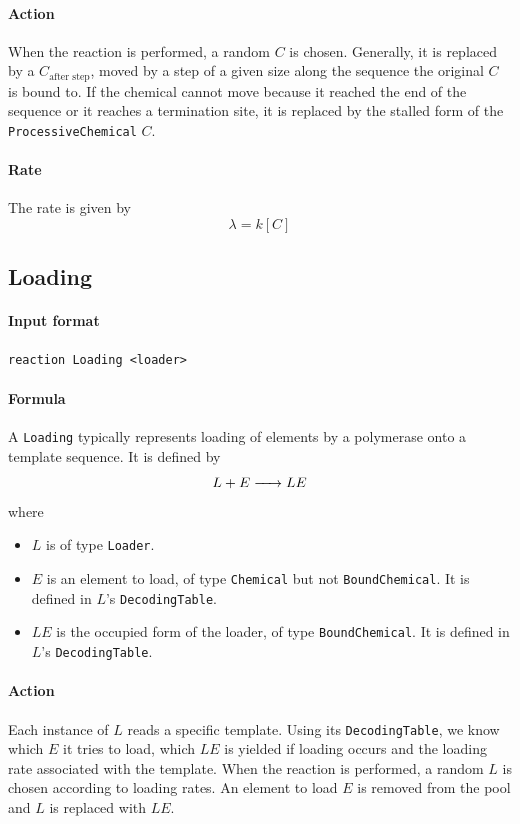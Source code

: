 \documentclass[12pt]{article}
\theoremstyle{definition}
\theoremstyle{remark}
\numberwithin{equation}{section}
\newcommand{\reactionIrr}[4]{#1 \ce{->[#3][#4]} #2}
\begin{document}
\paragraph{Action} When the reaction is performed, a random $C$ is chosen. Generally, it is replaced by a $C_\text{after step}$, moved by a step of a given size along the sequence the original $C$ is bound to. If the chemical cannot move because it reached the end of the sequence or it reaches a termination site, it is replaced by the stalled form of the \texttt{ProcessiveChemical} $C$.

\paragraph{Rate} The rate is given by
$$
	\lambda = k [C]
$$

\subsection{Loading}
\paragraph{Input format}
\begin{verbatim}
reaction Loading <loader>
\end{verbatim}

\paragraph{Formula} A \texttt{Loading} typically represents loading of elements by a polymerase onto a template sequence. It is defined by
$$
	\reactionIrr{L + E}{LE}{}{}
$$
where
\begin{itemize}
	\item $L$ is of type \texttt{Loader}.
	\item $E$ is an element to load, of type \texttt{Chemical} but not \texttt{BoundChemical}. It is defined in $L$'s \texttt{DecodingTable}.
	\item $LE$ is the occupied form of the loader, of type \texttt{BoundChemical}. It is defined in $L$'s \texttt{DecodingTable}.
\end{itemize}

\paragraph{Action} Each instance of $L$ reads a specific template. Using its \texttt{DecodingTable}, we know which $E$ it tries to load, which $LE$ is yielded if loading occurs and the loading rate associated with the template. When the reaction is performed, a random $L$ is chosen according to loading rates. An element to load $E$ is removed from the pool and $L$ is replaced with $LE$.
\end{document}
